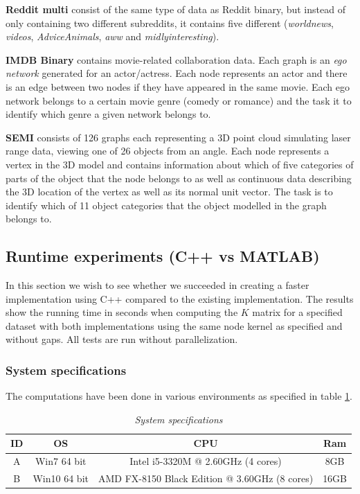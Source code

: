 \documentclass{article}
\begin{document}
\textbf{Reddit multi} \cite{yanardag} consist of the same type of data as Reddit binary, but instead of only containing two different subreddits, it contains five different (\textit{worldnews}, \textit{videos}, \textit{AdviceAnimals}, \textit{aww} and \textit{midlyinteresting}).

\textbf{IMDB Binary} \cite{yanardag} contains movie-related collaboration data. Each graph is an \textit{ego network} generated for an actor/actress. Each node represents an actor and there is an edge between two nodes if they have appeared in the same movie. Each ego network belongs to a certain movie genre (comedy or romance) and the task it to identify which genre a given network belongs to.

\textbf{SEMI} \cite{robot-grasping} consists of 126 graphs each representing a 3D point cloud simulating laser range data, viewing one of 26 objects from an angle. Each node represents a vertex in the 3D model and contains information about which of five categories of parts of the object that the node belongs to as well as continuous data describing the 3D location of the vertex as well as its normal unit vector. The task is to identify which of 11 object categories that the object modelled in the graph belongs to.

\subsection{Runtime experiments (C++ vs MATLAB)}
In this section we wish to see whether we succeeded in creating a faster implementation using C++ compared to the existing implementation. The results show the running time in seconds when computing the $K$ matrix for a specified dataset with both implementations using the same node kernel as specified and without gaps. All tests are run without parallelization.

\subsubsection{System specifications}
The computations have been done in various environments as specified in table \ref{table:specs}.
\begin{table}[H]
	\centering
	\hspace*{-0.7in}
	\scalebox{0.7} {
		\begin{tabular}{c|c|c|c}
			ID & OS & CPU & Ram\\
			\hline
			A & Win7 64 bit & Intel i5-3320M @ 2.60GHz (4 cores) & 8GB \\
			\hline
			B & Win10 64 bit & AMD FX-8150 Black Edition @ 3.60GHz (8 cores) & 16GB
			
		\end{tabular}
	}
	
	\caption{\textit{System specifications}}
	\label{table:specs}
\end{table}
\end{document}

